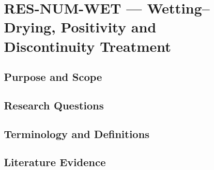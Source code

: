 
\section{RES-NUM-WET --- Wetting–Drying, Positivity and Discontinuity Treatment}
\label{sec:res-num-wet}

\subsection{Purpose and Scope}
\label{sec:res-num-wet-purpose}


\subsection{Research Questions}
\label{sec:res-num-wet-research-questions}


\subsection{Terminology and Definitions}
\label{sec:res-num-wet-definitions}


\subsection{Literature Evidence}
\label{sec:res-num-wet-literature-evidence}

%

